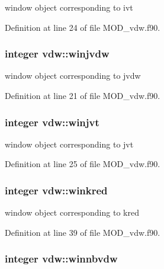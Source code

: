 window object corresponding to ivt 



Definition at line 24 of file M\-O\-D\-\_\-vdw.\-f90.

\hypertarget{classvdw_af57e0531d67b1526fbcff2a6873c9667}{
\subsubsection[{winjvdw}]{\setlength{\rightskip}{0pt plus 5cm}integer vdw\-::winjvdw}}\label{classvdw_af57e0531d67b1526fbcff2a6873c9667}


window object corresponding to jvdw 



Definition at line 21 of file M\-O\-D\-\_\-vdw.\-f90.

\hypertarget{classvdw_a9402b47403482ddf1e425de0a0ba6d9c}{
\subsubsection[{winjvt}]{\setlength{\rightskip}{0pt plus 5cm}integer vdw\-::winjvt}}\label{classvdw_a9402b47403482ddf1e425de0a0ba6d9c}


window object corresponding to jvt 



Definition at line 25 of file M\-O\-D\-\_\-vdw.\-f90.

\hypertarget{classvdw_a41d847388846c64c9b93a49d3af33ce5}{
\subsubsection[{winkred}]{\setlength{\rightskip}{0pt plus 5cm}integer vdw\-::winkred}}\label{classvdw_a41d847388846c64c9b93a49d3af33ce5}


window object corresponding to kred 



Definition at line 39 of file M\-O\-D\-\_\-vdw.\-f90.

\hypertarget{classvdw_adbe248422d32ce2af00ba24891cf41b3}{
\subsubsection[{winnbvdw}]{\setlength{\rightskip}{0pt plus 5cm}integer vdw\-::winnbvdw}}\label{classvdw_adbe248422d32ce2af00ba24891cf41b3}


